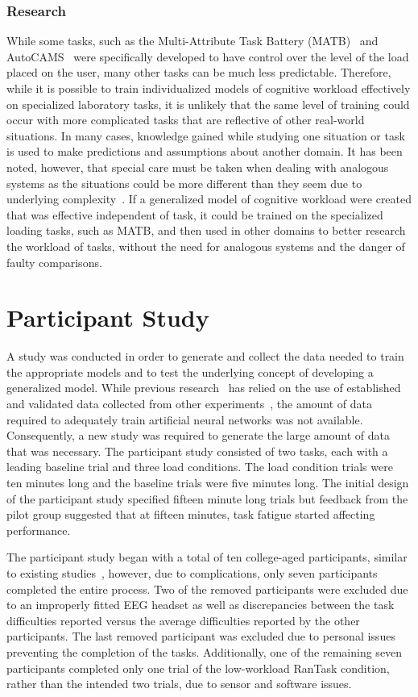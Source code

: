 \documentclass[11pt]{article}
\begin{document}
		\subsubsection{Research}
		While some tasks, such as the Multi-Attribute Task Battery (MATB)~\cite{Comstock} and AutoCAMS~\cite{Lorenz} were specifically developed to have control over the level of the load placed on the user, many other tasks can be much less predictable. Therefore, while it is possible to train individualized models of cognitive workload effectively on specialized laboratory tasks, it is unlikely that the same level of training could occur with more complicated tasks that are reflective of other real-world situations. In many cases, knowledge gained while studying one situation or task is used to make predictions and assumptions about another domain. It has been noted, however, that special care must be taken when dealing with analogous systems as the situations could be more different than they seem due to underlying complexity~\cite{Huey}. If a generalized model of cognitive workload were created that was effective independent of task, it could be trained on the specialized loading tasks, such as MATB, and then used in other domains to better research the workload of tasks, without the need for analogous systems and the danger of faulty comparisons.


\section{Participant Study}
A study was conducted in order to generate and collect the data needed to train the appropriate models and to test the underlying concept of developing a generalized model. While previous research~\cite{Wang_Z} has relied on the use of established and validated data collected from other experiments~\cite{Wilson_2010}, the amount of data required to adequately train artificial neural networks was not available. Consequently, a new study was required to generate the large amount of data that was necessary. The participant study consisted of two tasks, each with a leading baseline trial and three load conditions. The load condition trials were ten minutes long and the baseline trials were five minutes long. 
The initial design of the participant study specified fifteen minute long trials but feedback from the pilot group suggested that at fifteen minutes, task fatigue started affecting performance.

The participant study began with a total of ten college-aged participants, similar to existing studies~\cite{Ting,Wang_R,Wilson_2010, Yin, Zhang}, however, due to complications, only seven participants completed the entire process. 
Two of the removed participants were excluded due to an improperly fitted EEG headset as well as discrepancies between the task difficulties reported versus the average difficulties reported by the other participants. The last removed participant was excluded due to personal issues preventing the completion of the tasks. Additionally, one of the remaining seven participants completed only one trial of the low-workload RanTask condition, rather than the intended two trials, due to sensor and software issues.
\end{document}
